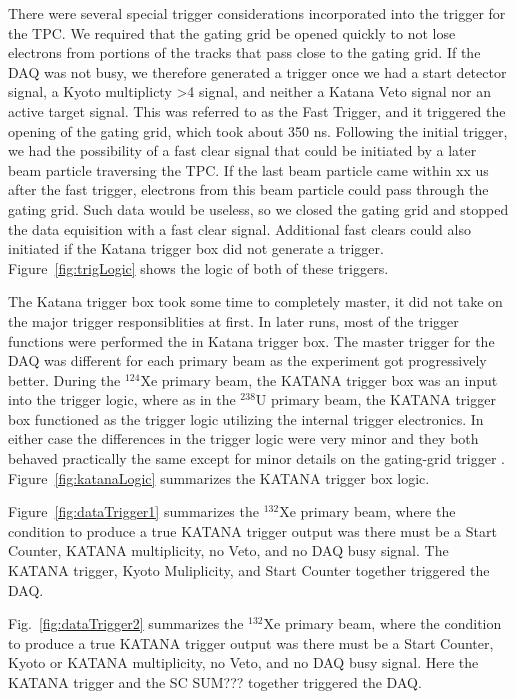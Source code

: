 There were several special trigger considerations incorporated into the trigger for the TPC. We required that the gating grid be opened quickly to not lose electrons from portions of the tracks that pass close to the gating grid. If the DAQ was not busy, we therefore generated a trigger once we had a start detector signal, a Kyoto multiplicty >4 signal, and neither a Katana Veto signal nor an active target signal. This was referred to as the Fast Trigger, and it triggered the opening of the gating grid, which took about 350 ns. Following the initial trigger, we had the possibility of a fast clear signal that could be initiated by a later beam particle traversing the TPC. If the last beam particle came within xx us after the fast trigger, electrons from this beam particle could pass through the gating grid. Such data would be useless, so we closed the gating grid and stopped the data equisition with a fast clear signal. Additional fast clears could also initiated if the Katana trigger box did not generate a trigger. Figure~\ref{fig:trigLogic} shows the logic of both of these triggers.

The Katana trigger box took some time to completely master, it did not take on the major trigger responsiblities at first. In later runs, most of the trigger functions were performed the in Katana trigger box. The master trigger for the DAQ was different for each primary beam as the experiment got progressively better. During the ${}^{124}$Xe primary beam, the KATANA trigger box was an input into the trigger logic, where as in the ${}^{238}$U primary beam, the KATANA trigger box functioned as the trigger logic utilizing the internal trigger electronics. In either case the differences in the trigger logic were very minor and they both behaved practically the same except for minor details on the gating-grid trigger \cite{jon}. Figure~\ref{fig:katanaLogic} summarizes the KATANA trigger box logic. 

Figure~\ref{fig:dataTrigger1} summarizes the ${}^{132}$Xe primary beam, where the condition to produce a true KATANA trigger output was there must be a Start Counter, KATANA multiplicity, no Veto, and no DAQ busy signal. The KATANA trigger, Kyoto Muliplicity, and Start Counter together triggered the DAQ. 

 Fig.~\ref{fig:dataTrigger2} summarizes the ${}^{132}$Xe primary beam, where the condition to produce a true KATANA trigger output was there must be a Start Counter, Kyoto or KATANA multiplicity, no Veto, and no DAQ busy signal. Here the KATANA trigger and the SC SUM??? together triggered the DAQ. 
 
